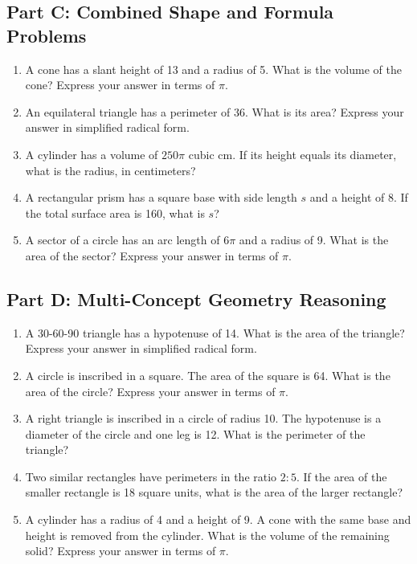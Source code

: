 \documentclass[14pt]{extarticle}
\begin{document}
\subsection*{Part C: Combined Shape and Formula Problems}
\begin{enumerate}
  \item A cone has a slant height of 13 and a radius of 5. What is the volume of the cone? Express your answer in terms of \(\pi\).
  \item An equilateral triangle has a perimeter of 36. What is its area? Express your answer in simplified radical form.
  \item A cylinder has a volume of \(250\pi\) cubic cm. If its height equals its diameter, what is the radius, in centimeters?
  \item A rectangular prism has a square base with side length \(s\) and a height of 8. If the total surface area is 160, what is \(s\)?
  \item A sector of a circle has an arc length of \(6\pi\) and a radius of 9. What is the area of the sector? Express your answer in terms of \(\pi\).
\end{enumerate}

\subsection*{Part D: Multi-Concept Geometry Reasoning}
\begin{enumerate}
  \item A 30-60-90 triangle has a hypotenuse of 14. What is the area of the triangle? Express your answer in simplified radical form.
  \item A circle is inscribed in a square. The area of the square is 64. What is the area of the circle? Express your answer in terms of \(\pi\).
  \item A right triangle is inscribed in a circle of radius 10. The hypotenuse is a diameter of the circle and one leg is 12. What is the perimeter of the triangle?
  \item Two similar rectangles have perimeters in the ratio \(2:5\). If the area of the smaller rectangle is 18 square units, what is the area of the larger rectangle?
  \item A cylinder has a radius of 4 and a height of 9. A cone with the same base and height is removed from the cylinder. What is the volume of the remaining solid? Express your answer in terms of \(\pi\).
\end{enumerate}
\end{document}
